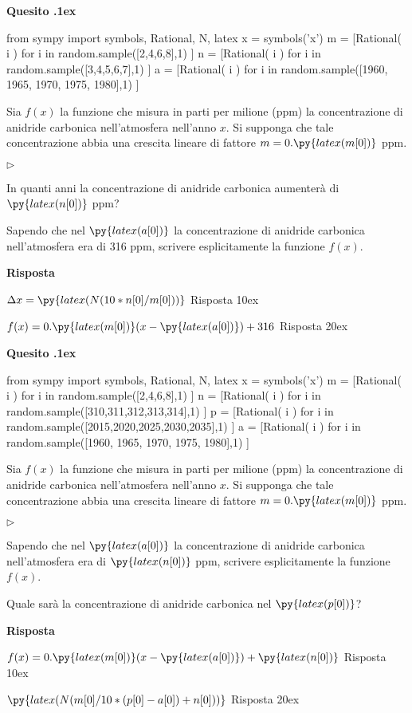 \documentclass[11pt,twoside,a4paper]{article}
\newcommand{\mylabel}[1]{#1\hfill}
\renewenvironment{itemize}
  {\begin{list}{$\triangleright$}{%
   \setlength{\parskip}{0mm}
   \setlength{\topsep}{.4\baselineskip}
   \setlength{\rightmargin}{0mm}
   \setlength{\listparindent}{0mm}
   \setlength{\itemindent}{0mm}
   \setlength{\labelwidth}{2ex}
   \setlength{\itemsep}{.4\baselineskip}
   \setlength{\parsep}{0mm}
   \setlength{\partopsep}{0mm}
   \setlength{\labelsep}{1ex}
   \setlength{\leftmargin}{\labelwidth+\labelsep}
   \let\makelabel\mylabel}}{%
   \end{list}\vspace*{-1.3mm}}
\newcounter{quesito}
\newenvironment{question}{\bigskip\addtocounter{quesito}{1}\bigskip\bigskip\par\textbf{Quesito \thequesito.\kern1ex}}{\vspace{\parskip}}
\newenvironment{answer}{\par\textbf{Risposta\quad}}{\vspace{\parskip}}
\begin{document}
\begin{question}
\begin{pycode}
from sympy import symbols, Rational, N, latex
x = symbols('x')
m = [Rational( i ) for i in random.sample([2,4,6,8],1) ]
n = [Rational( i ) for i in random.sample([3,4,5,6,7],1) ]
a = [Rational( i ) for i in random.sample([1960, 1965, 1970, 1975, 1980],1) ]
\end{pycode}
Sia $f(x)$ la funzione che misura in parti per milione (ppm) la concentrazione di anidride carbonica nell'atmosfera nell'anno $x$. Si supponga che tale concentrazione abbia una crescita lineare di fattore $m = 0.\py{latex(m[0])}$ ppm.
\begin{itemize}
\item[1.] In quanti anni la concentrazione di anidride carbonica aumenter\`a di $\py{latex(n[0])}$ ppm?
\item[2.] Sapendo che nel $\py{latex(a[0])}$ la concentrazione di anidride carbonica nell'atmosfera era di 316 ppm, scrivere esplicitamente la funzione $f(x)$.
\end{itemize}
\begin{answer}

{\color{blue}
$\Delta x = \py{latex(N(10*n[0]/m[0]))}$
\hfill Risposta 1\kern0ex}

\smallskip
{\color{blue}
$f(x) = 0.\py{latex(m[0])} ( x - \py{latex(a[0])}) + 316$
\hfill Risposta 2\kern0ex}

\end{answer}
\end{question}
\begin{question}
\begin{pycode}
from sympy import symbols, Rational, N, latex
x = symbols('x')
m = [Rational( i ) for i in random.sample([2,4,6,8],1) ]
n = [Rational( i ) for i in random.sample([310,311,312,313,314],1) ]
p = [Rational( i ) for i in random.sample([2015,2020,2025,2030,2035],1) ]
a = [Rational( i ) for i in random.sample([1960, 1965, 1970, 1975, 1980],1) ]
\end{pycode}
Sia $f(x)$ la funzione che misura in parti per milione (ppm) la concentrazione di anidride carbonica nell'atmosfera nell'anno $x$. Si supponga che tale concentrazione abbia una crescita lineare di fattore $m = 0.\py{latex(m[0])}$ ppm.
\begin{itemize}
\item[1.] Sapendo che nel $\py{latex(a[0])}$ la concentrazione di anidride carbonica nell'atmosfera era di $\py{latex(n[0])}$ ppm, scrivere esplicitamente la funzione $f(x)$.
\item[2.] Quale sar\`a la concentrazione di anidride carbonica nel $\py{latex(p[0])}$?
\end{itemize}
\begin{answer}

\smallskip
{\color{blue}
$f(x) = 0.\py{latex(m[0])} ( x - \py{latex(a[0])}) + \py{latex(n[0])}$
\hfill Risposta 1\kern0ex}

{\color{blue}
$\py{latex(N(m[0]/10*(p[0]-a[0])+n[0]))}$
\hfill Risposta 2\kern0ex}

\end{answer}
\end{question}
\end{document}
